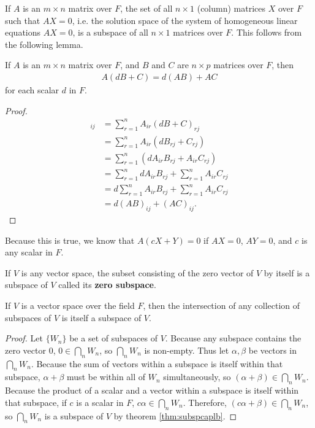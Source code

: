 \documentclass[12pt]{article}
\begin{document}
\begin{exm}
  If $A$ is an $m \times n$ matrix over $F$, the set of all $n \times 1$ (column)
  matrices $X$ over $F$ such that $AX = 0$, i.e. the solution space of the system of
  homogeneous linear equations $AX = 0$, is a subspace of all $n \times 1$ matrices
  over $F$. This follows from the following lemma.

  \begin{nlemma}
    If $A$ is an $m \times n$ matrix over $F$, and $B$ and $C$ are $n \times p$
    matrices over $F$, then
    \begin{align*}
      A(dB + C) = d(AB) + AC
    \end{align*}
    for each scalar $d$ in $F$.

    \begin{proof}
      \begin{align*}
        [A(dB + C)]_{ij} &= \sum_{r = 1}^{n}A_{ir}(dB + C)_{rj}\\
        &= \sum_{r = 1}^{n}A_{ir}(dB_{rj} + C_{rj})\\
        &= \sum_{r = 1}^{n}(dA_{ir}B_{rj} + A_{ir}C_{rj})\\
        &= \sum_{r = 1}^{n}dA_{ir}B_{rj} + \sum_{r = 1}^{n}A_{ir}C_{rj}\\
        &= d\sum_{r = 1}^{n}A_{ir}B_{rj} + \sum_{r = 1}^{n}A_{ir}C_{rj}\\
        &= d(AB)_{ij} + (AC)_{ij}.
      \end{align*}
    \end{proof}
  \end{nlemma}

  Because this is true, we know that $A(cX + Y) = 0$ if $AX = 0$, $AY = 0$, and $c$
  is any scalar in $F$.
\end{exm}

\begin{defn}
  If $V$ is any vector space, the subset consisting of the zero vector of $V$ by
  itself is a subspace of $V$ called its \textbf{zero subspace}.
\end{defn}

\begin{thm}
  If $V$ is a vector space over the field $F$, then the intersection of any
  collection of subspaces of $V$ is itself a subspace of $V$.

  \begin{proof}
    Let $\{W_n\}$ be a set of subspaces of $V$. Because any subspace contains the
    zero vector $0$, $0 \in \bigcap_{n}W_n$, so $\bigcap_{n}W_n$ is non-empty. Thus
    let $\alpha,\beta$ be vectors in $\bigcap_{n}W_n$. Because the sum of vectors
    within a subspace is itself within that subspace, $\alpha + \beta$ must be within
    all of $W_n$ simultaneously, so $(\alpha + \beta) \in \bigcap_{n}W_n$. Because
    the product of a scalar and a vector within a subspace is itself within that
    subspace, if $c$ is a scalar in $F$, $c\alpha \in \bigcap_{n}W_n$. Therefore,
    $(c\alpha + \beta) \in \bigcap_{n}W_n$, so $\bigcap_{n}W_n$ is a subspace of $V$
    by theorem \ref{thm:subspcaplb}.
  \end{proof}
\end{thm}
\end{document}
